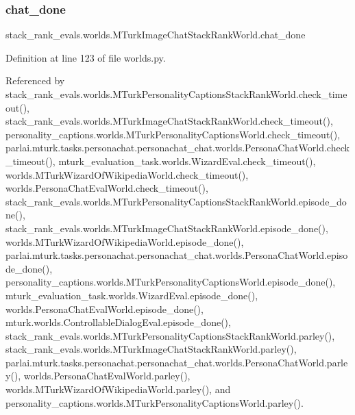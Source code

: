 \mbox{\label{classstack__rank__evals_1_1worlds_1_1MTurkImageChatStackRankWorld_a39dde5ea7b8663db5c02cc1b69702037}} 
\subsubsection{\texorpdfstring{chat\+\_\+done}{chat\_done}}
{\footnotesize\ttfamily stack\+\_\+rank\+\_\+evals.\+worlds.\+M\+Turk\+Image\+Chat\+Stack\+Rank\+World.\+chat\+\_\+done}



Definition at line 123 of file worlds.\+py.



Referenced by stack\+\_\+rank\+\_\+evals.\+worlds.\+M\+Turk\+Personality\+Captions\+Stack\+Rank\+World.\+check\+\_\+timeout(), stack\+\_\+rank\+\_\+evals.\+worlds.\+M\+Turk\+Image\+Chat\+Stack\+Rank\+World.\+check\+\_\+timeout(), personality\+\_\+captions.\+worlds.\+M\+Turk\+Personality\+Captions\+World.\+check\+\_\+timeout(), parlai.\+mturk.\+tasks.\+personachat.\+personachat\+\_\+chat.\+worlds.\+Persona\+Chat\+World.\+check\+\_\+timeout(), mturk\+\_\+evaluation\+\_\+task.\+worlds.\+Wizard\+Eval.\+check\+\_\+timeout(), worlds.\+M\+Turk\+Wizard\+Of\+Wikipedia\+World.\+check\+\_\+timeout(), worlds.\+Persona\+Chat\+Eval\+World.\+check\+\_\+timeout(), stack\+\_\+rank\+\_\+evals.\+worlds.\+M\+Turk\+Personality\+Captions\+Stack\+Rank\+World.\+episode\+\_\+done(), stack\+\_\+rank\+\_\+evals.\+worlds.\+M\+Turk\+Image\+Chat\+Stack\+Rank\+World.\+episode\+\_\+done(), worlds.\+M\+Turk\+Wizard\+Of\+Wikipedia\+World.\+episode\+\_\+done(), parlai.\+mturk.\+tasks.\+personachat.\+personachat\+\_\+chat.\+worlds.\+Persona\+Chat\+World.\+episode\+\_\+done(), personality\+\_\+captions.\+worlds.\+M\+Turk\+Personality\+Captions\+World.\+episode\+\_\+done(), mturk\+\_\+evaluation\+\_\+task.\+worlds.\+Wizard\+Eval.\+episode\+\_\+done(), worlds.\+Persona\+Chat\+Eval\+World.\+episode\+\_\+done(), mturk.\+worlds.\+Controllable\+Dialog\+Eval.\+episode\+\_\+done(), stack\+\_\+rank\+\_\+evals.\+worlds.\+M\+Turk\+Personality\+Captions\+Stack\+Rank\+World.\+parley(), stack\+\_\+rank\+\_\+evals.\+worlds.\+M\+Turk\+Image\+Chat\+Stack\+Rank\+World.\+parley(), parlai.\+mturk.\+tasks.\+personachat.\+personachat\+\_\+chat.\+worlds.\+Persona\+Chat\+World.\+parley(), worlds.\+Persona\+Chat\+Eval\+World.\+parley(), worlds.\+M\+Turk\+Wizard\+Of\+Wikipedia\+World.\+parley(), and personality\+\_\+captions.\+worlds.\+M\+Turk\+Personality\+Captions\+World.\+parley().


